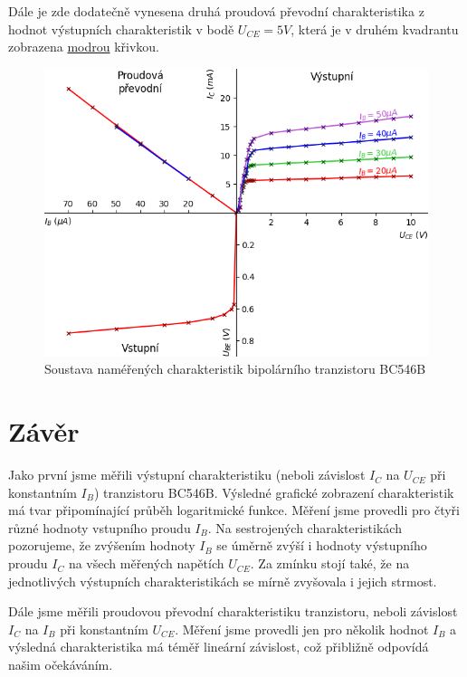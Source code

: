 \documentclass[a4paper, czech]{article}
\begin{document}
Dále je zde dodatečně vynesena druhá proudová převodní charakteristika z hodnot výstupních charakteristik v bodě $U_{CE} = 5V$, která je v druhém kvadrantu zobrazena \underline{modrou} křivkou.

\begin{figure}[H]
    \centering
    \includegraphics{vach.png}
    \caption{Soustava naméřených charakteristik bipolárního tranzistoru BC546B}
    \label{obr:1}
\end{figure}

\newpage

\section{Závěr}

Jako první jsme měřili výstupní charakteristiku (neboli závislost $I_C$ na $U_{CE}$ při konstantním $I_B$) tranzistoru BC546B.
Výsledné grafické zobrazení charakteristik má tvar připomínající průběh logaritmické funkce.
Měření jsme provedli pro čtyři různé hodnoty vstupního proudu $I_B$.
Na sestrojených charakteristikách pozorujeme, že zvýšením hodnoty $I_B$ se úměrně zvýší i hodnoty výstupního proudu $I_C$ na všech měřených napětích $U_{CE}$.
Za zmínku stojí také, že na jednotlivých výstupních charakteristikách se mírně zvyšovala i jejich strmost.

Dále jsme měřili proudovou převodní charakteristiku tranzistoru, neboli závislost $I_C$ na $I_B$ při konstantním $U_{CE}$.
Měření jsme provedli jen pro několik hodnot $I_B$ a výsledná charakteristika má téměř lineární závislost, což přibližně odpovídá našim očekáváním.
\end{document}

